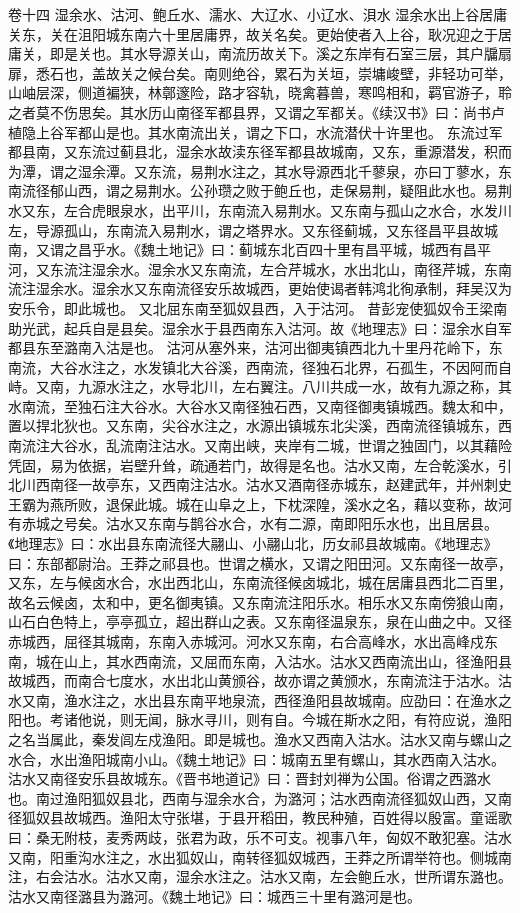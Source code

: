 \documentclass[12pt,UTF8]{ctexbook}
\begin{document}
卷十四  湿余水、沽河、鲍丘水、濡水、大辽水、小辽水、浿水 
湿余水出上谷居庸关东，关在沮阳城东南六十里居庸界，故关名矣。更始使者入上谷，耿况迎之于居庸关，即是关也。其水导源关山，南流历故关下。溪之东岸有石室三层，其户牖扇扉，悉石也，盖故关之候台矣。南则绝谷，累石为关垣，崇墉峻壁，非轻功可举，山岫层深，侧道褊狭，林鄣邃险，路才容轨，晓禽暮兽，寒鸣相和，羁官游子，聆之者莫不伤思矣。其水历山南径军都县界，又谓之军都关。《续汉书》曰：尚书卢植隐上谷军都山是也。其水南流出关，谓之下口，水流潜伏十许里也。
东流过军都县南，又东流过蓟县北，湿余水故渎东径军都县故城南，又东，重源潜发，积而为潭，谓之湿余潭。又东流，易荆水注之，其水导源西北千蓼泉，亦曰丁蓼水，东南流径郁山西，谓之易荆水。公孙瓒之败于鲍丘也，走保易荆，疑阻此水也。易荆水又东，左合虎眼泉水，出平川，东南流入易荆水。又东南与孤山之水合，水发川左，导源孤山，东南流入易荆水，谓之塔界水。又东径蓟城，又东径昌平县故城南，又谓之昌乎水。《魏土地记》曰：蓟城东北百四十里有昌平城，城西有昌平河，又东流注湿余水。湿余水又东南流，左合芹城水，水出北山，南径芹城，东南流注湿余水。湿余水又东南流径安乐故城西，更始使谒者韩鸿北徇承制，拜吴汉为安乐令，即此城也。
又北屈东南至狐奴县西，入于沽河。
昔彭宠使狐奴令王梁南助光武，起兵自是县矣。湿余水于县西南东入沽河。故《地理志》曰：湿余水自军都县东至潞南入沽是也。
沽河从塞外来，沽河出御夷镇西北九十里丹花岭下，东南流，大谷水注之，水发镇北大谷溪，西南流，径独石北界，石孤生，不因阿而自峙。又南，九源水注之，水导北川，左右翼注。八川共成一水，故有九源之称，其水南流，至独石注大谷水。大谷水又南径独石西，又南径御夷镇城西。魏太和中，置以捍北狄也。又东南，尖谷水注之，水源出镇城东北尖溪，西南流径镇城东，西南流注大谷水，乱流南注沽水。又南出峡，夹岸有二城，世谓之独固门，以其藉险凭固，易为依据，岩壁升耸，疏通若门，故得是名也。沽水又南，左合乾溪水，引北川西南径一故亭东，又西南注沽水。沽水又酒南径赤城东，赵建武年，并州刺史王霸为燕所败，退保此城。城在山阜之上，下枕深隍，溪水之名，藉以变称，故河有赤城之号矣。沽水又东南与鹊谷水合，水有二源，南即阳乐水也，出且居县。《地理志》曰：水出县东南流径大翮山、小翮山北，历女祁县故城南。《地理志》曰：东部都尉治。王莽之祁县也。世谓之横水，又谓之阳田河。又东南径一故亭，又东，左与候卤水合，水出西北山，东南流径候卤城北，城在居庸县西北二百里，故名云候卤，太和中，更名御夷镇。又东南流注阳乐水。相乐水又东南傍狼山南，山石白色特上，亭亭孤立，超出群山之表。又东南径温泉东，泉在山曲之中。又径赤城西，屈径其城南，东南入赤城河。河水又东南，右合高峰水，水出高峰戍东南，城在山上，其水西南流，又屈而东南，入沽水。沽水又西南流出山，径渔阳县故城西，而南合七度水，水出北山黄颁谷，故亦谓之黄颁水，东南流注于沽水。沽水又南，渔水注之，水出县东南平地泉流，西径渔阳县故城南。应劭曰：在渔水之阳也。考诸他说，则无闻，脉水寻川，则有自。今城在斯水之阳，有符应说，渔阳之名当属此，秦发闾左戍渔阳。即是城也。渔水又西南入沽水。沽水又南与螺山之水合，水出渔阳城南小山。《魏土地记》曰：城南五里有螺山，其水西南入沽水。沽水又南径安乐县故城东。《晋书地道记》曰：晋封刘禅为公国。俗谓之西潞水也。南过渔阳狐奴县北，西南与湿余水合，为潞河；沽水西南流径狐奴山西，又南径狐奴县故城西。渔阳太守张堪，于县开稻田，教民种殖，百姓得以殷富。童谣歌曰：桑无附枝，麦秀两歧，张君为政，乐不可支。视事八年，匈奴不敢犯塞。沽水又南，阳重沟水注之，水出狐奴山，南转径狐奴城西，王莽之所谓举符也。侧城南注，右会沽水。沽水又南，湿余水注之。沽水又南，左会鲍丘水，世所谓东潞也。沽水又南径潞县为潞河。《魏土地记》曰：城西三十里有潞河是也。
\end{document}

